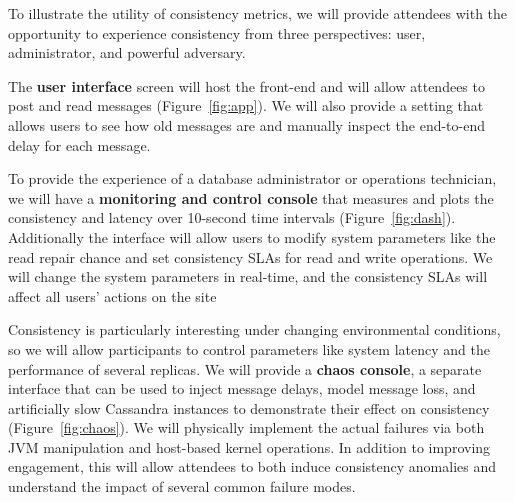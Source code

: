 
To illustrate the utility of consistency metrics, we will provide
attendees with the opportunity to experience consistency from three
perspectives: user, administrator, and powerful adversary.

The \textbf{user interface} screen will host the {\systemname}
front-end and will allow attendees to post and read messages
(Figure~\ref{fig:app}). We will also provide a setting that
allows users to see how old messages are and manually inspect the
end-to-end delay for each message. %

To provide the experience of a database administrator or operations
technician, we will have a \textbf{monitoring and control console}
that measures and plots the consistency and latency over 10-second
time intervals (Figure~\ref{fig:dash}).
Additionally the interface will allow users to modify system parameters like
the read repair chance and set consistency SLAs for read and write
operations. We will change the system parameters in real-time, and the
consistency SLAs will affect all users' actions on the site

Consistency is particularly interesting under changing environmental
conditions, so we will allow participants to control parameters like
system latency and the performance of several replicas. We will provide
a \textbf{chaos console}, a separate interface that can be used to
inject message delays, model message loss, and artificially
slow Cassandra instances to demonstrate their effect on consistency
(Figure~\ref{fig:chaos}). We will physically implement the actual failures via
both JVM manipulation and host-based kernel operations. In addition to
improving engagement, this will allow attendees to both induce
consistency anomalies and understand the impact of several common
failure modes.
